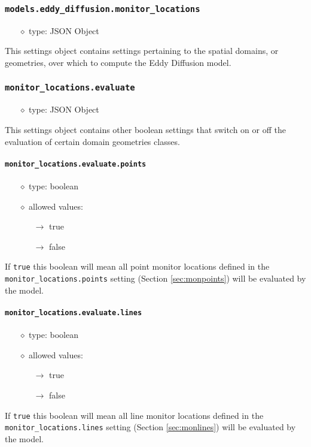 \documentclass[]{article}
\def\code#1{\texttt{#1}}
\begin{document}
\subsubsection{\code{models.eddy\_diffusion.monitor\_locations}}
\begin{itemize}
    \item[$\diamond$] type: JSON Object 
\end{itemize}
This settings object contains settings pertaining to the spatial domains, or
geometries, over which to compute the Eddy Diffusion model.

\subsubsection{\code{monitor\_locations.evaluate}}
\begin{itemize}
    \item[$\diamond$] type: JSON Object 
\end{itemize}
This settings object contains other boolean settings that switch on or off the
evaluation of certain domain geometries classes.

\paragraph{\code{monitor\_locations.evaluate.points}}
\begin{itemize}
    \item[$\diamond$] type: boolean
    \item[$\diamond$] allowed values:
    \begin{itemize}
        \item[$\rightarrow$] true
        \item[$\rightarrow$] false
    \end{itemize}
\end{itemize}
If \code{true} this boolean will mean all point monitor locations defined in the
\code{monitor\_locations.points} setting (Section \ref{sec:monpoints}) will be
evaluated by the model.

\paragraph{\code{monitor\_locations.evaluate.lines}}
\begin{itemize}
    \item[$\diamond$] type: boolean
    \item[$\diamond$] allowed values:
    \begin{itemize}
        \item[$\rightarrow$] true
        \item[$\rightarrow$] false
    \end{itemize}
\end{itemize}
If \code{true} this boolean will mean all line monitor locations defined in the
\code{monitor\_locations.lines} setting (Section \ref{sec:monlines}) will be
evaluated by the model.
\end{document}
